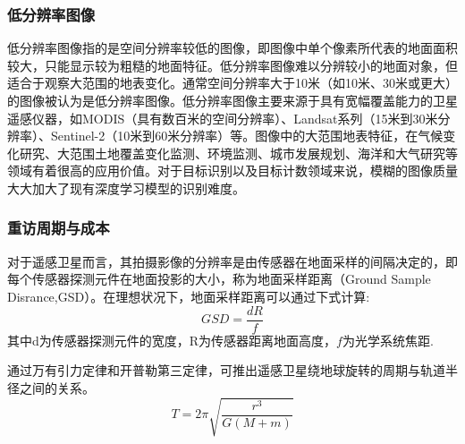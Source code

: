 \subsubsection{低分辨率图像}

低分辨率图像指的是空间分辨率较低的图像，即图像中单个像素所代表的地面面积较大，只能显示较为粗糙的地面特征。低分辨率图像难以分辨较小的地面对象，但适合于观察大范围的地表变化。通常空间分辨率大于10米（如10米、30米或更大）的图像被认为是低分辨率图像。低分辨率图像主要来源于具有宽幅覆盖能力的卫星遥感仪器，如MODIS（具有数百米的空间分辨率）、Landsat系列（15米到30米分辨率）、Sentinel-2（10米到60米分辨率）等。图像中的大范围地表特征，在气候变化研究、大范围土地覆盖变化监测、环境监测、城市发展规划、海洋和大气研究等领域有着很高的应用价值。对于目标识别以及目标计数领域来说，模糊的图像质量大大加大了现有深度学习模型的识别难度。


\subsubsection{重访周期与成本}




对于遥感卫星而言，其拍摄影像的分辨率是由传感器在地面采样的间隔决定的，即每个传感器探测元件在地面投影的大小，称为地面采样距离（Ground Sample Disrance,GSD）。在理想状况下，地面采样距离可以通过下式计算:
\begin{equation}
    GSD = {\frac{dR}{f}} \label{eq:GSD}​​​​
\end{equation}
其中d为传感器探测元件的宽度，R为传感器距离地面高度，\(f\)为光学系统焦距.

通过万有引力定律和开普勒第三定律，可推出遥感卫星绕地球旋转的周期与轨道半径之间的关系。
\begin{equation}
    T = 2\pi \sqrt{\frac{r^3}{G (M + m)}} \label{eq:T}​​​​
\end{equation}

